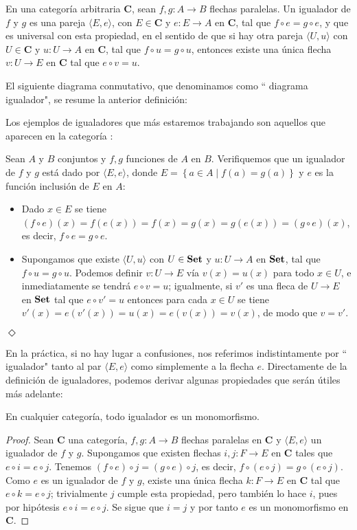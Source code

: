 \begin{Def}
   En una categoría arbitraria $\textbf{C}$, sean $f,g:A\to B$ flechas paralelas. Un igualador de $f$ y $g$ es una pareja $\langle E,e\rangle$, con $E\in\textbf{C}$ y $e:E\to A$ en $\textbf{C}$, tal que $f\circ e=g\circ e$, y que es universal con esta propiedad, en el sentido de que si hay otra pareja $\langle U,u\rangle$ con $U\in \textbf{C}$ y $u:U\to A$ en $\textbf{C}$, tal que $f\circ u=g\circ u$, entonces existe una única flecha $v:U\to E$ en $\textbf{C}$ tal que $e\circ v=u$. 
\end{Def}
El siguiente diagrama conmutativo, que denominamos como `` diagrama igualador", se resume la anterior definición:


Los ejemplos de igualadores que más estaremos trabajando son aquellos que aparecen en la categoría :
\begin{Ejm}
   Sean $A$ y $B$ conjuntos y $f,g$ funciones de $A$ en $B$. Verifiquemos que un igualador de $f$ y $g$ está dado por $\langle E,e\rangle$, donde $E=\left\lbrace a\in A\mid f(a)=g(a)\right\rbrace$ y $e$ es la función inclusión de $E$ en $A$:
   \begin{itemize}
      \item Dado $x\in E$ se tiene $(f\circ e)(x)=f(e(x))=f(x)=g(x)=g(e(x))=(g\circ e)(x)$, es decir, $f\circ e=g\circ e$.
      \item Supongamos que existe $\langle U,u\rangle$ con $U\in \normalfont{\textbf{Set}}$ y $u:U\to A$ en $\normalfont{\textbf{Set}}$, tal que $f\circ u=g\circ u$. Podemos definir $v:U\to E$ vía $v(x)=u(x)$ para todo $x\in U$, e inmediatamente se tendrá $e\circ v=u$; igualmente, si $v'$ es una fleca de $U\to E$ en $\normalfont{\textbf{Set}}$ tal que $e\circ v'=u$ entonces para cada $x\in U$ se tiene $v'(x)=e(v'(x))=u(x)=e(v(x))=v(x)$, de modo que $v=v'$.
   \end{itemize}
\hspace{\fill}$\Diamond$
\end{Ejm}
En la práctica, si no hay lugar a confusiones, nos referimos indistintamente por `` igualador" tanto al par $\langle E,e\rangle$ como simplemente a la flecha $e$. Directamente de la definición de igualadores, podemos derivar algunas propiedades que serán útiles más adelante:
\begin{Prop}\label{Prop:Igualadores1}
   En cualquier categoría, todo igualador es un monomorfismo.  
\end{Prop}
\begin{proof}
   Sean $\textbf{C}$ una categoría, $f,g:A\to B$ flechas paralelas en $\textbf{C}$ y $\langle E,e\rangle$ un igualador de $f$ y $g$. Supongamos que existen flechas $i,j:F\to E$ en $\textbf{C}$ tales que $e\circ i=e\circ j$. Tenemos $(f\circ e)\circ j=(g\circ e)\circ j$, es decir, $f\circ (e\circ j)=g\circ (e\circ j)$. Como $e$ es un igualador de $f$ y $g$, existe una única flecha $k:F\to E$ en $\textbf{C}$ tal que $e\circ k=e\circ j$; trivialmente $j$ cumple esta propiedad, pero también lo hace $i$, pues por hipótesis $e\circ i=e\circ j$. Se sigue que $i=j$ y por tanto $e$ es un monomorfismo en $\textbf{C}$.

\end{proof}
